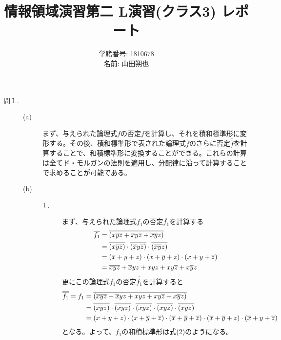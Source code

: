 \documentclass{jsarticle}
\title{情報領域演習第二 L演習(クラス3) レポート}
\author{学籍番号: 1810678 \\
        名前: 山田朔也}
\begin{document}
  \maketitle
  \begin{description}
      \item[問１.]
      \begin{description}
          \item[(a)]
          まず、与えられた論理式$f$の否定$\overline{f}$を計算し、それを積和標準形に変形する。その後、積和標準形で表された論理式$\overline{f}$のさらに否定$\overline{\overline{f}}$を計算することで、和積標準形に変換することができる。これらの計算は全てド・モルガンの法則を適用し、分配律に沿って計算することで求めることが可能である。

          \item[(b)]
          \begin{description}
              \item[$\rm \hspace{.18em}i\hspace{.18em}$.]
              まず、与えられた論理式$f_1$の否定$\overline{f_1}$を計算する
              \begin{align}
                  \overline{f_1} &= \overline{(x\overline{y}\overline{z} + \overline{x}y\overline{z} +  \overline{x}\overline{y}z)} \notag \\
                                 &= \overline{(x\overline{y}\overline{z})} \cdot \overline{(\overline{x}y\overline{z})} \cdot \overline{(\overline{x}\overline{y}z)} \notag \\
                                 &= (\overline{x}+y+z) \cdot (x+\overline{y}+z) \cdot (x+y+\overline{z}) \notag \\
                                 &= \overline{x}\overline{y}\overline{z} + \overline{x}yz + xyz + xy\overline{z} + x\overline{y}z
              \end{align}
              更にこの論理式$\overline{f_1}$の否定$\overline{\overline{f_1}}$を計算すると
              \begin{align}
                  \overline{\overline{f_1}} = f_1
                                            &= \overline{(\overline{x}\overline{y}\overline{z} + \overline{x}yz + xyz + xy\overline{z} + x\overline{y}z)} \notag \\
                                            &= \overline{(\overline{x}\overline{y}\overline{z})} \cdot \overline{(\overline{x}yz)} \cdot \overline{(xyz)} \cdot \overline{(xy\overline{z})} \cdot \overline{(x\overline{y}z)} \notag \\
                                            &= (x+y+z) \cdot (x+\overline{y}+\overline{z}) \cdot (\overline{x}+\overline{y}+\overline{z}) \cdot (\overline{x}+\overline{y}+z) \cdot (\overline{x}+y+\overline{z})
              \end{align}
              となる。よって、$f_1$の和積標準形は式(2)のようになる。


\end{description}
\end{description}
\end{description}
\end{document}
